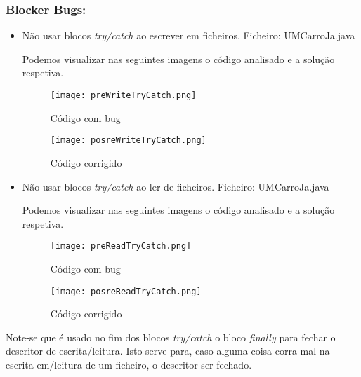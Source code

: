 \subsubsection{Blocker Bugs:}
\begin{itemize}
\item Não usar blocos \textit{try/catch} ao escrever em ficheiros.\newline
 Ficheiro: UMCarroJa.java\newline


\par Podemos visualizar nas seguintes imagens o código analisado e a solução respetiva.

\begin{figure}[H]

  \centering

  \texttt{[image: preWriteTryCatch.png]}

  \caption {Código com bug}

  \label {fig02}

\end{figure}

\begin{figure}[H]

  \centering

  \texttt{[image: posreWriteTryCatch.png]}

  \caption {Código corrigido}

  \label {fig03}

\end{figure}

\item Não usar blocos \textit{try/catch} ao ler de ficheiros.\newline
 Ficheiro: UMCarroJa.java\newline


\par Podemos visualizar nas seguintes imagens o código analisado e a solução respetiva.


\begin{figure}[H]

  \centering

  \texttt{[image: preReadTryCatch.png]}

  \caption {Código com bug}

  \label {fig04}

\end{figure}

\begin{figure}[H]

  \centering

  \texttt{[image: posreReadTryCatch.png]}

  \caption {Código corrigido}

  \label {fig05}

\end{figure}

\end{itemize}
\par Note-se que é usado no fim dos blocos \textit{try/catch} o bloco \textit{finally} para fechar o descritor de escrita/leitura. Isto serve para, caso alguma coisa corra mal na escrita em/leitura de um ficheiro, o descritor ser fechado. 

